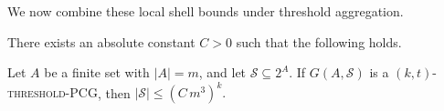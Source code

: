 \documentclass[a4paper,UKenglish,cleveref,autoref,thm-restate]{socg-lipics-v2021}
\begin{document}

We now combine these local shell bounds under threshold aggregation.

\begin{theorem}\label{thm:threshold-set-system}
There exists an absolute constant $C>0$ such that the following holds.

Let $A$ be a finite set with $|A|=m$, and let $\mathcal S\subseteq 2^A$. If
$G(A,\mathcal S)$ is a \textsc{$(k,t)$-threshold-\textsc{PCG}}, then
\(
|\mathcal S|\le (C\,m^3)^k.
\)
\end{theorem}
\end{document}

